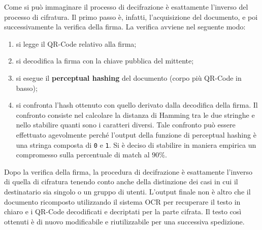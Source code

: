 Come si può immaginare il processo di decifrazione è esattamente l'inverso del processo di cifratura.
Il primo passo è, infatti, l'acquisizione del documento, e poi successivamente la verifica della firma.
La verifica avviene nel seguente modo:
\begin{enumerate}
	\item si legge il QR-Code relativo alla firma;
	\item si decodifica la firma con la chiave pubblica del mittente;
	\item si esegue il \textbf{perceptual hashing} del documento (corpo più QR-Code in basso);
	\item si confronta l'hash ottenuto con quello derivato dalla decodifica della firma. Il confronto consiste nel calcolare la distanza di Hamming tra le due stringhe e nello stabilire quanti sono i caratteri diversi. Tale confronto può essere effettuato agevolmente perché l'output della funzione di perceptual hashing è una stringa composta di \texttt{0} e \texttt{1}. Si è deciso di stabilire in maniera empirica un compromesso sulla percentuale di match al $90$\%.
\end{enumerate}
Dopo la verifica della firma, la procedura di decifrazione è esattamente l'inverso di quella di cifratura tenendo conto anche della distinzione dei casi in cui il destinatario sia singolo o un gruppo di utenti.
L'output finale non è altro che il documento ricomposto utilizzando il sistema OCR per recuperare il testo in chiaro e i QR-Code decodificati e decriptati per la parte cifrata. Il testo così ottenuti è di nuovo modificabile e riutilizzabile per una successiva spedizione.